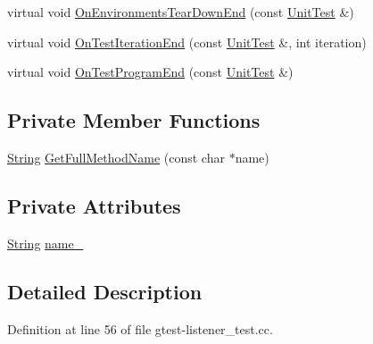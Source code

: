 \begin{DoxyCompactItemize}
\item 
virtual void \hyperlink{classtesting_1_1internal_1_1EventRecordingListener_af00cb6141021245e02c511782ce66b46}{\-On\-Environments\-Tear\-Down\-End} (const \hyperlink{classtesting_1_1UnitTest}{\-Unit\-Test} \&)
\item 
virtual void \hyperlink{classtesting_1_1internal_1_1EventRecordingListener_a60a8d8506639e2633c5dc911ad7bc6ed}{\-On\-Test\-Iteration\-End} (const \hyperlink{classtesting_1_1UnitTest}{\-Unit\-Test} \&, int iteration)
\item 
virtual void \hyperlink{classtesting_1_1internal_1_1EventRecordingListener_a79232f629150d6a1e560f6729271e729}{\-On\-Test\-Program\-End} (const \hyperlink{classtesting_1_1UnitTest}{\-Unit\-Test} \&)
\end{DoxyCompactItemize}
\subsection*{\-Private \-Member \-Functions}
\begin{DoxyCompactItemize}
\item 
\hyperlink{classtesting_1_1internal_1_1String}{\-String} \hyperlink{classtesting_1_1internal_1_1EventRecordingListener_a07f5a03ba5f726ae00b0d31d9a0a4170}{\-Get\-Full\-Method\-Name} (const char $\ast$name)
\end{DoxyCompactItemize}
\subsection*{\-Private \-Attributes}
\begin{DoxyCompactItemize}
\item 
\hyperlink{classtesting_1_1internal_1_1String}{\-String} \hyperlink{classtesting_1_1internal_1_1EventRecordingListener_a46d25a1d56b8ab56e84b8bd0c7581e8f}{name\-\_\-}
\end{DoxyCompactItemize}


\subsection{\-Detailed \-Description}


\-Definition at line 56 of file gtest-\/listener\-\_\-test.\-cc.



